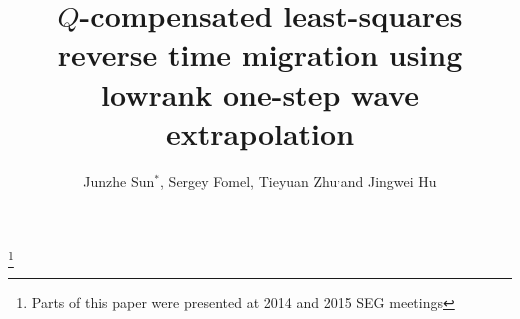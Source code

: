 \title{$Q$-compensated least-squares reverse time migration using lowrank one-step wave extrapolation}
\author{Junzhe Sun$^*$\footnotemark[1], Sergey Fomel\footnotemark[1], Tieyuan Zhu\footnotemark[1]$^,$\footnotemark[2] and Jingwei Hu\footnotemark[3]}
\maketitle

\address{
\footnotemark[1]Bureau of Economic Geology \\
John A. and Katherine G. Jackson School of Geosciences \\
The University of Texas at Austin \\
Austin, TX 78713 \\
\footnotemark[2] Department of Geosciences and Institute of Natural Gas Research \\
The Pennsylvania State University \\
University Park, PA 16802 \\
\footnotemark[3]Department of Mathematics \\
Purdue University \\
West Lafayette, IN 47907 
}

\footnote{Parts of this paper were presented at 2014 and 2015 SEG meetings}


